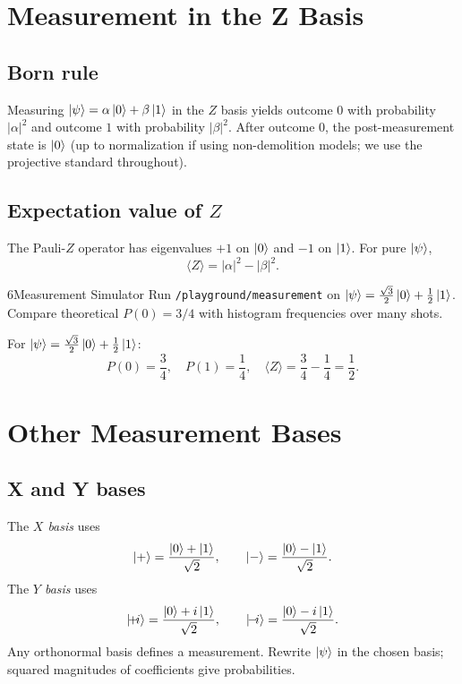 \section{Measurement in the Z Basis}
\label{sec:measurement-z}

\subsection{Born rule}

Measuring $\ket{\psi}=\alpha\ket{0}+\beta\ket{1}$ in the $Z$ basis yields outcome $0$ with probability $|\alpha|^2$ and outcome $1$ with probability $|\beta|^2$. After outcome $0$, the post-measurement state is $\ket{0}$ (up to normalization if using non-demolition models; we use the projective standard throughout).

\subsection{Expectation value of $Z$}

The Pauli-$Z$ operator has eigenvalues $+1$ on $\ket{0}$ and $-1$ on $\ket{1}$. For pure $\ket{\psi}$,
\begin{equation}
\langle Z\rangle = |\alpha|^2 - |\beta|^2.
\label{eq:expectation-z}
\end{equation}

\begin{labbox}{6}{Measurement Simulator}
Run \texttt{/playground/measurement} on $\ket{\psi}=\frac{\sqrt{3}}{2}\ket{0}+\frac{1}{2}\ket{1}$. Compare theoretical $P(0)=3/4$ with histogram frequencies over many shots.
\end{labbox}

\begin{example}
For $\ket{\psi}=\frac{\sqrt{3}}{2}\ket{0}+\frac{1}{2}\ket{1}$:
\[
P(0)=\frac{3}{4},\quad P(1)=\frac{1}{4},\quad \langle Z\rangle = \frac{3}{4}-\frac{1}{4}=\frac{1}{2}.
\]
\end{example}

\section{Other Measurement Bases}
\label{sec:other-bases}

\subsection{X and Y bases}

The \emph{$X$ basis} uses
\begin{equation}
\ket{+}=\frac{\ket{0}+\ket{1}}{\sqrt{2}},\qquad
\ket{-}=\frac{\ket{0}-\ket{1}}{\sqrt{2}}.
\label{eq:x-basis}
\end{equation}
The \emph{$Y$ basis} uses
\begin{equation}
\ket{\!+\!i}=\frac{\ket{0}+i\ket{1}}{\sqrt{2}},\qquad
\ket{\!-\!i}=\frac{\ket{0}-i\ket{1}}{\sqrt{2}}.
\label{eq:y-basis}
\end{equation}
Any orthonormal basis defines a measurement. Rewrite $\ket{\psi}$ in the chosen basis; squared magnitudes of coefficients give probabilities.

